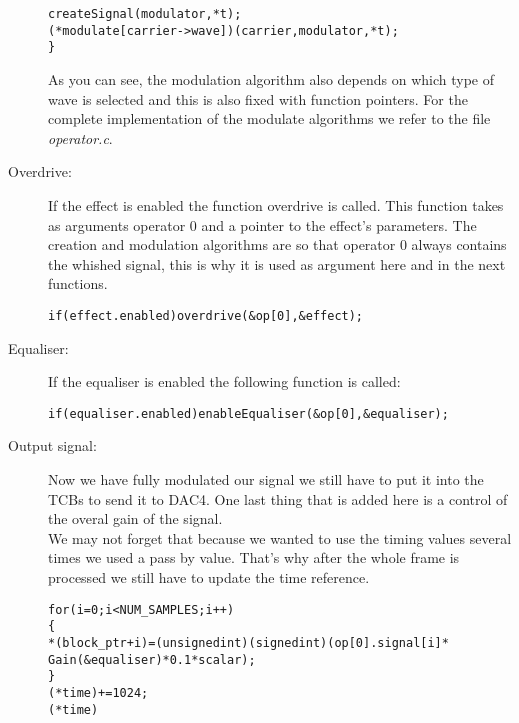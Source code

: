 \begin{description}
\begin{alltt}
	   createSignal(modulator, *t);		
	   (*modulate[carrier->wave])(carrier, modulator, *t);
	\}
\end{alltt}
As you can see, the modulation algorithm also depends on which type of wave is selected and this is also fixed with function pointers. For the complete implementation of the modulate algorithms we refer to the file \emph{operator.c}.
\item[Overdrive:] If the effect is enabled the function overdrive is called. This function takes as arguments operator 0 and a pointer to the effect's parameters. The creation and modulation algorithms are so that operator 0 always contains the whished signal, this is why it is used as argument here and in the next functions.
\begin{alltt}
	if( effect.enabled ) overdrive(&op[0], &effect);
\end{alltt}
\item[Equaliser:] If the equaliser is enabled the following function is called: 
\begin{alltt}
	if( equaliser.enabled ) enableEqualiser(&op[0], &equaliser);
\end{alltt}
\item[Output signal:] Now we have fully modulated our signal we still have to put it into the TCBs to send it to DAC4. One last thing that is added here is a control of the overal gain of the signal. \\ We may not forget that because we wanted to use the timing values several times we used a pass by value. That's why after the whole frame is processed we still have to update the time reference.
\begin{alltt}
	for(i=0;i<NUM\_SAMPLES;i++)
	\{	
       *(block\_ptr+i) = (unsigned int)(signed int)(op[0].signal[i] * 
       								    	  Gain(\&equaliser)*0.1*scalar );
	\}
	(*time)+= 1024;  
	(*time)%=sampleFreq;
\end{alltt}
\end{description}
